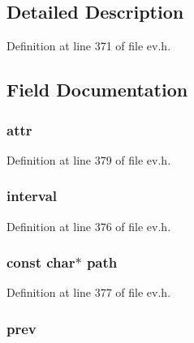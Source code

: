 \subsection{\-Detailed \-Description}


\-Definition at line 371 of file ev.\-h.



\subsection{\-Field \-Documentation}
\hypertarget{structev__stat_a597fb418c2fd88ae12847805bddbe09d}{
\subsubsection[{attr}]{ {\bf attr}}}\label{structev__stat_a597fb418c2fd88ae12847805bddbe09d}


\-Definition at line 379 of file ev.\-h.

\hypertarget{structev__stat_a710c94a682e5e9281b2e5162e265b726}{
\subsubsection[{interval}]{ {\bf interval}}}\label{structev__stat_a710c94a682e5e9281b2e5162e265b726}


\-Definition at line 376 of file ev.\-h.

\hypertarget{structev__stat_a3b02c6de5c049804444a246f7fdf46b4}{
\subsubsection[{path}]{\setlength{\rightskip}{0pt plus 5cm}const char$\ast$ {\bf path}}}\label{structev__stat_a3b02c6de5c049804444a246f7fdf46b4}


\-Definition at line 377 of file ev.\-h.

\hypertarget{structev__stat_a02b7b656210f66c84f0b28cf3f4c745d}{
\subsubsection[{prev}]{ {\bf prev}}}\label{structev__stat_a02b7b656210f66c84f0b28cf3f4c745d}


